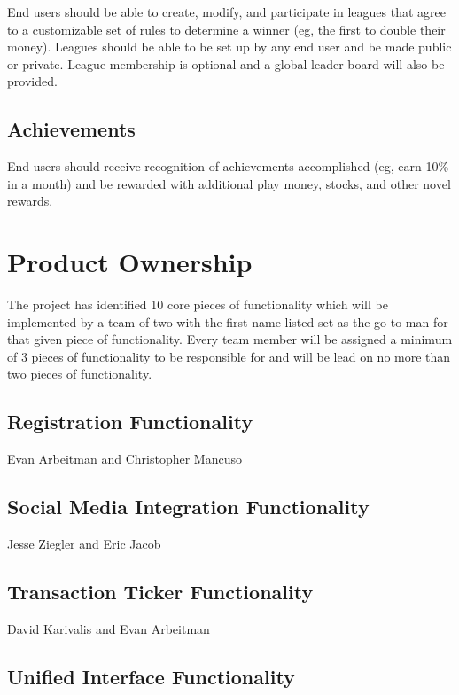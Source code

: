 \documentclass[11pt,letterpaper,oneside]{memoir}
\begin{document}
End users should be able to create, modify, and participate in leagues that
agree to a customizable set of rules to determine a winner (eg, the first to
double their money).  Leagues should be able to be set up by any end user and
be made public or private.  League membership is optional and a global
leader board will also be provided.

\section{Achievements}

End users should receive recognition of achievements accomplished (eg, earn 10\% in a month) and
be rewarded with additional play money, stocks, and other novel rewards.

\chapter{Product Ownership}
The project has identified 10 core pieces of functionality which will be implemented by a team of two
with the first name listed set as the go to man for that given piece of functionality.  Every team
member will be assigned a minimum of 3 pieces of functionality to be responsible for and will be
lead on no more than two pieces of functionality.

\section{Registration Functionality}

Evan Arbeitman and Christopher Mancuso

\section{Social Media Integration Functionality}

Jesse Ziegler and Eric Jacob

\section{Transaction Ticker Functionality}

David Karivalis and Evan Arbeitman

\section{Unified Interface Functionality}
\end{document}
